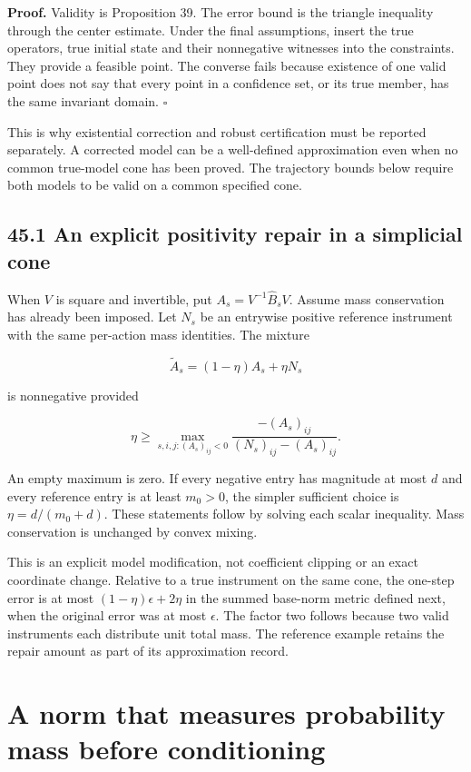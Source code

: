 \textbf{Proof.} Validity is Proposition 39. The error bound is the
triangle inequality through the center estimate. Under the final
assumptions, insert the true operators, true initial state and their
nonnegative witnesses into the constraints. They provide a feasible
point. The converse fails because existence of one valid point does not
say that every point in a confidence set, or its true member, has the
same invariant domain. \(\square\)

This is why existential correction and robust certification must be
reported separately. A corrected model can be a well-defined
approximation even when no common true-model cone has been proved. The
trajectory bounds below require both models to be valid on a common
specified cone.

\subsection{45.1 An explicit positivity repair in a simplicial
cone}\label{LSM:an-explicit-positivity-repair-in-a-simplicial-cone}

When \(V\) is square and invertible, put \(A_s=V^{-1}\widehat B_sV\).
Assume mass conservation has already been imposed. Let \(N_s\) be an
entrywise positive reference instrument with the same per-action mass
identities. The mixture

\[
\widetilde A_s=(1-\eta)A_s+\eta N_s
\]

is nonnegative provided

\[
\eta\geq\max_{s,i,j:(A_s)_{ij}<0}
\frac{-(A_s)_{ij}}{(N_s)_{ij}-(A_s)_{ij}}.
\]

An empty maximum is zero. If every negative entry has magnitude at most
\(d\) and every reference entry is at least \(m_0>0\), the simpler
sufficient choice is \(\eta=d/(m_0+d)\). These statements follow by
solving each scalar inequality. Mass conservation is unchanged by convex
mixing.

This is an explicit model modification, not coefficient clipping or an
exact coordinate change. Relative to a true instrument on the same cone,
the one-step error is at most \((1-\eta)\epsilon+2\eta\) in the summed
base-norm metric defined next, when the original error was at most
\(\epsilon\). The factor two follows because two valid instruments each
distribute unit total mass. The reference example retains the repair
amount as part of its approximation record.

\section{A norm that measures probability mass before conditioning}\label{LSM:a-norm-that-measures-probability-mass-before-conditioning}

